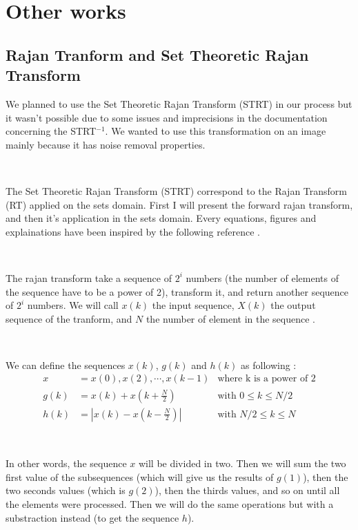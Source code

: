\chapter{Other works}


\section{Rajan Tranform and Set Theoretic Rajan Transform}

We planned to use the Set Theoretic Rajan Transform (STRT) in our process but it wasn't possible due to some issues and imprecisions in the documentation concerning the STRT$^{-1}$. We wanted to use this transformation on an image mainly because it has noise removal properties.

~~

The Set Theoretic Rajan Transform (STRT) correspond to the Rajan Transform (RT) applied on the sets domain. First I will present the forward rajan transform, and then it's application in the sets domain. Every equations, figures and explainations have been inspired by the following reference  \cite{bib:symbolic:RajanTransform}.

~~

The rajan transform take a sequence of $2^{i}$ numbers (the number of elements of the sequence have to be a power of 2), transform it, and return another sequence of $2^{i}$ numbers. We will call $x(k)$ the input sequence, $X(k)$ the output sequence of the tranform, and $N$ the number of element in the sequence \cite{bib:symbolic:RajanTransform}. 

~~

We can define the sequences $x(k)$, $g(k)$ and $h(k)$ as following : 
\begin{align}
x &= x(0), x(2), \cdots, x(k-1) & \text{where k is a power of 2} \\
g(k) &= x(k) + x(k + \frac{N}{2}) & \text{with } 0 \leq k \leq N / 2 \\
h(k) &= | x(k) - x(k - \frac{N}{2}) | & \text{with } N / 2 \leq k \leq N
\end{align}

~~

In other words, the sequence $x$ will be divided in two. Then we will sum the two first value of the subsequences (which will give us the results of $g(1)$), then the two seconds values (which is $g(2)$), then the thirds values, and so on until all the elements were processed. Then we will do the same operations but with a substraction instead (to get the sequence $h$).

